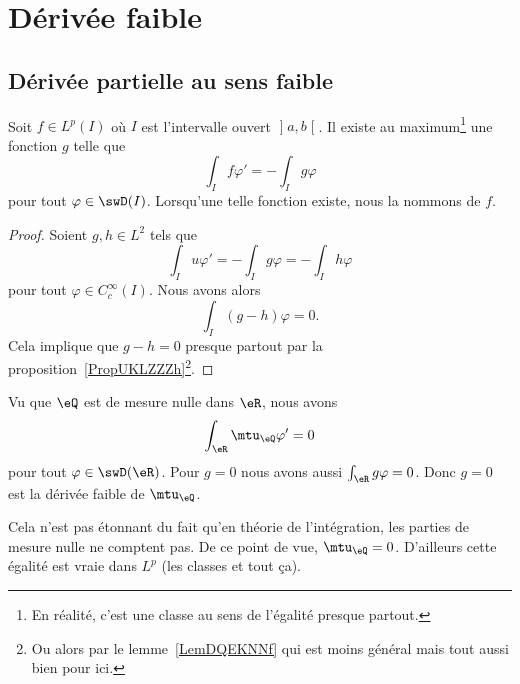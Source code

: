 \section{Dérivée faible}

\subsection{Dérivée partielle au sens faible}

\begin{lemmaDef}        \label{DEFooIRJQooMVNopl}
	Soit \( f\in L^p(I)\) où \( I\) est l'intervalle ouvert \( \mathopen] a , b \mathclose[\). Il existe au maximum\footnote{En réalité, c'est une classe au sens de l'égalité presque partout.} une fonction \( g\) telle que
	\begin{equation}
		\int_If\varphi'=-\int_Ig\varphi
	\end{equation}
	pour tout \( \varphi\in \swD(I)   \). Lorsqu'une telle fonction existe, nous la nommons  de \( f\).
\end{lemmaDef}

\begin{proof}
	Soient \( g,h\in L^2\) tels que
	\begin{equation}
		\int_Iu\varphi'=-\int_Ig\varphi=-\int_Ih\varphi
	\end{equation}
	pour tout \( \varphi\in C^{\infty}_c(I)\). Nous avons alors
	\begin{equation}
		\int_I(g-h)\varphi=0.
	\end{equation}
	Cela implique que \( g-h=0\) presque partout par la proposition~\ref{PropUKLZZZh}\footnote{Ou alors par le lemme~\ref{LemDQEKNNf} qui est moins général mais tout aussi bien pour ici.}.
\end{proof}

\begin{example}
	Vu que \( \eQ\) est de mesure nulle dans \( \eR\), nous avons
	\begin{equation}
		\int_{\eR}\mtu_{\eQ}\varphi'=0
	\end{equation}
	pour tout \( \varphi\in\swD(\eR)\). Pour \( g=0\) nous avons aussi \( \int_{\eR}g\varphi=0\). Donc \( g=0\) est la dérivée faible de \( \mtu_{\eQ}\).

	Cela n'est pas étonnant du fait qu'en théorie de l'intégration, les parties de mesure nulle ne comptent pas. De ce point de vue, \( \mtu_{\eQ}=0\). D'ailleurs cette égalité est vraie dans \( L^p\) (les classes et tout ça).
\end{example}


